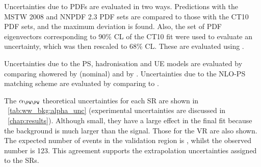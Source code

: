 Uncertainties due to PDFs are evaluated in two ways. Predictions with the MSTW 2008 
\cite{MSTW} and NNPDF 2.3 \cite{NNPDF} PDF sets are compared to those with the CT10 
\cite{CTEQ} PDF sets, and the maximum deviation is found. Also, the set of PDF 
eigenvectors corresponding to 90\% CL of the CT10 fit were used to evaluate an 
uncertainty, which was then rescaled to 68\% CL. These are evaluated using \amcatnlo.

Uncertainties due to the PS, hadronisation and UE models are evaluated by 
comparing \powhegbox showered by  (nominal) and by \fherwig. 
Uncertainties due to the NLO-PS matching scheme are evaluated by comparing 
\meps{\powhegbox}{\fherwig} to \meps{\amcatnlo}{\fherwig}.

The $\alpha_{\WW}$ theoretical uncertainties for each SR are shown in 
\Table~\ref{tab:ww_bkg:alpha_unc} (experimental uncertainties are discussed in 
\Chapter~\ref{chap:results}). Although small, they have a large effect in the final fit 
because the \WW background is much larger than the signal. Those for the VR are also shown. 
The expected number of events in the validation region is , whilst the 
observed number is 123. This agreement supports the extrapolation uncertainties 
assigned to the SRs.

